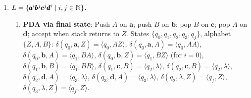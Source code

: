 \begin{enumerate}[{10.}1. ]
\begin{enumerate}
In GNF, $R^{\pmb{*}}$ needs the first symbol to be a terminal. Since $R\pmb{^*}$ starts with $R$, which generates strings starting with $\pmb{a},\pmb{b},\pmb{c},\pmb{\epsilon},\pmb{\emptyset},\pmb{(}$, we get:
$R \to \pmb{a}\pmb{^*} \mid \pmb{b}\pmb{^*} \mid \pmb{(}R\pmb{\cdot}R\pmb{)}^{\pmb{*}} \mid \ldots$

Let $Y$ handle the tail after the first terminal in longer productions:
$R \to \pmb{(}YR\pmb{)}$ where $Y \to R\pmb{\cdot}$ or $Y \to R\pmb{\cup}$.

More precisely in GNF:
\begin{align*}
R &\to \pmb{a} \mid \pmb{b} \mid \pmb{c} \mid \pmb{\epsilon} \mid \pmb{\emptyset} \\
R &\to \pmb{(}RYR\pmb{)} \\
R &\to \pmb{(}RZR\pmb{)} \\
R &\to R\pmb{^*} \to \text{(substitute and eliminate left recursion)}
\end{align*}
For $R\pmb{^*}$: introduce $R \to \pmb{a}Y_a \mid \pmb{b}Y_b \mid \ldots$ where $Y_a \to \pmb{^*}$.

\item \textbf{PDA from GNF grammar} (Definition 10.6): The PDA has a single state $q$, initial stack symbol $R$. For each GNF production $R \to a\alpha$, add transition $\delta(q,a,R) = \langle q,\alpha\rangle$. The PDA accepts via empty stack.

\item \textbf{PDA accepting via final state} (Theorem 10.4): From the empty-stack PDA $P$, construct $P_f$ by adding a new initial state that pushes a marker, and a new final state that pops the marker. $L(P_f) = L(P)$.
\end{enumerate}

\item \textbf{$L=\{\pmb{a}^i\pmb{b}^j\pmb{c}^j\pmb{d}^i \mid i,j\in\mathbb{N}\}$.}

\begin{enumerate}
\item \textbf{PDA via final state}: Push $A$ on $\pmb{a}$; push $B$ on $\pmb{b}$; pop $B$ on $\pmb{c}$; pop $A$ on $\pmb{d}$; accept when stack returns to $Z$.
States $\{q_0,q_1,q_2,q_3,q_f\}$, alphabet $\{Z,A,B\}$:
$\delta(q_0,\pmb{a},Z)=\langle q_0,AZ\rangle$, $\delta(q_0,\pmb{a},A)=\langle q_0,AA\rangle$,
$\delta(q_0,\pmb{b},A)=\langle q_1,BA\rangle$, $\delta(q_0,\pmb{b},Z)=\langle q_1,BZ\rangle$ (for $i=0$),
$\delta(q_1,\pmb{b},B)=\langle q_1,BB\rangle$, $\delta(q_1,\pmb{c},B)=\langle q_2,\lambda\rangle$,
$\delta(q_2,\pmb{c},B)=\langle q_2,\lambda\rangle$, $\delta(q_2,\pmb{d},A)=\langle q_3,\lambda\rangle$,
$\delta(q_3,\pmb{d},A)=\langle q_3,\lambda\rangle$, $\delta(q_2,\lambda,Z)=\langle q_f,Z\rangle$, $\delta(q_3,\lambda,Z)=\langle q_f,Z\rangle$.


\end{enumerate}
\end{enumerate}
